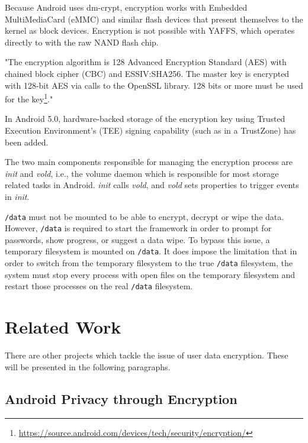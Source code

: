 Because Android uses dm-crypt, encryption works with Embedded MultiMediaCard (eMMC) and similar flash devices that present themselves to the kernel as block devices. Encryption is not possible with YAFFS, which operates directly to with the raw NAND flash chip.

"The encryption algorithm is 128 Advanced Encryption Standard (AES) with chained block cipher (CBC) and ESSIV:SHA256. The master key is encrypted with 128-bit AES via calls to the OpenSSL library. 128 bits or more must be used for the key\footnote{\url{https://source.android.com/devices/tech/security/encryption/}}."

In Android 5.0, hardware-backed storage of the encryption key using Trusted Execution Environment’s (TEE) signing capability (such as in a TrustZone) has been added.

The two main components responsible for managing the encryption process are \textit{init} and \textit{vold}, i.e., the volume daemon which is responsible for most storage related tasks in Android. \textit{init} calls \textit{vold}, and \textit{vold} sets properties to trigger events in \textit{init}.

\texttt{/data} must not be mounted to be able to encrypt, decrypt or wipe the data. However, \texttt{/data} is required to start the framework in order to prompt for passwords, show progress, or suggest a data wipe. To bypass this issue, a temporary filesystem is mounted on \texttt{/data}. It does impose the limitation that in order to switch from the temporary filesystem to the true \texttt{/data} filesystem, the system must stop every process with open files on the temporary filesystem and restart those processes on the real \texttt{/data} filesystem.

\section{Related Work}
\label{sec:related-work}

There are other projects which tackle the issue of user data encryption. These will be presented in the following paragraphs.

\subsection{Android Privacy through Encryption}
\label{sub-sec:and-priv-defreez}

